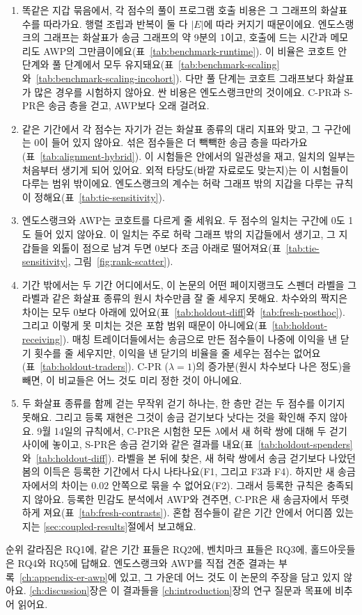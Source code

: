 \begin{enumerate}
\item[C1.] 똑같은 지갑 묶음에서, 각 점수의 풀이 프로그램 호출 비용은 그 그래프의 화살표 수를 따라가요. 행렬 조립과 반복이 둘 다 $|E|$에 따라 커지기 때문이에요. 엔도스랭크의 그래프는 화살표가 송금 그래프의 약 9분의 1이고, 호출에 드는 시간과 메모리도 AWP의 그만큼이에요(표~\ref{tab:benchmark-runtime}). 이 비율은 코호트 안 단계와 풀 단계에서 모두 유지돼요(표~\ref{tab:benchmark-scaling}와~\ref{tab:benchmark-scaling-incohort}). 다만 풀 단계는 코호트 그래프보다 화살표가 많은 경우를 시험하지 않아요. 싼 비용은 엔도스랭크만의 것이에요. C-PR과 S-PR은 송금 층을 걷고, AWP보다 오래 걸려요.
\item[C2.] 같은 기간에서 각 점수는 자기가 걷는 화살표 종류의 대리 지표와 맞고, 그 구간에는 0이 들어 있지 않아요. 섞은 점수들은 더 빽빽한 송금 층을 따라가요(표~\ref{tab:alignment-hybrid}). 이 시험들은 안에서의 일관성을 재고, 일치의 일부는 처음부터 생기게 되어 있어요. 외적 타당도(바깥 자료로도 맞는지)는 이 시험들이 다루는 범위 밖이에요. 엔도스랭크의 계수는 허락 그래프 밖의 지갑을 다루는 규칙이 정해요(표~\ref{tab:tie-sensitivity}).
\item[C3.] 엔도스랭크와 AWP는 코호트를 다르게 줄 세워요. 두 점수의 일치는 구간에 0도 1도 들어 있지 않아요. 이 일치는 주로 허락 그래프 밖의 지갑들에서 생기고, 그 지갑들을 외톨이 점으로 남겨 두면 0보다 조금 아래로 떨어져요(표~\ref{tab:tie-sensitivity}, 그림~\ref{fig:rank-scatter}).
\item[C4.] 기간 밖에서는 두 기간 어디에서도, 이 논문의 어떤 페이지랭크도 스펜더 라벨을 그 라벨과 같은 화살표 종류의 원시 차수만큼 잘 줄 세우지 못해요. 차수와의 짝지은 차이는 모두 0보다 아래에 있어요(표~\ref{tab:holdout-diff}와~\ref{tab:fresh-posthoc}). 그리고 이렇게 못 미치는 것은 포함 범위 때문이 아니에요(표~\ref{tab:holdout-receiving}). 매칭 트레이더들에서는 송금으로 만든 점수들이 나중에 이익을 낸 닫기 횟수를 줄 세우지만, 이익을 낸 닫기의 비율을 줄 세우는 점수는 없어요(표~\ref{tab:holdout-traders}). C-PR ($\lambda=1$)의 증가분(원시 차수보다 나은 정도)을 빼면, 이 비교들은 어느 것도 미리 정한 것이 아니에요.
\item[C5.] 두 화살표 종류를 함께 걷는 무작위 걷기 하나는, 한 층만 걷는 두 점수를 이기지 못해요. 그리고 등록 재현은 그것이 송금 걷기보다 낫다는 것을 확인해 주지 않아요. 9월 14일의 규칙에서, C-PR은 시험한 모든 $\lambda$에서 새 허락 쌍에 대해 두 걷기 사이에 놓이고, S-PR은 송금 걷기와 같은 결과를 내요(표~\ref{tab:holdout-spenders}와~\ref{tab:holdout-diff}). 라벨을 본 뒤에 찾은, 새 허락 쌍에서 송금 걷기보다 나았던 봄의 이득은 등록한 기간에서 다시 나타나요(F1, 그리고 F3과 F4). 하지만 새 송금자에서의 차이는 $0.02$ 안쪽으로 묶을 수 없어요(F2). 그래서 등록한 규칙은 충족되지 않아요. 등록한 민감도 분석에서 AWP와 견주면, C-PR은 새 송금자에서 뚜렷하게 져요(표~\ref{tab:fresh-contrasts}). 혼합 점수들이 같은 기간 안에서 어디쯤 있는지는 \ref{sec:coupled-results}절에서 보고해요.
\end{enumerate}

순위 갈라짐은 RQ1에, 같은 기간 표들은 RQ2에, 벤치마크 표들은 RQ3에, 홀드아웃들은 RQ4와 RQ5에 답해요. 엔도스랭크와 AWP를 직접 견준 결과는 부록~\ref{ch:appendix-er-awp}에 있고, 그 가운데 어느 것도 이 논문의 주장을 담고 있지 않아요. \ref{ch:discussion}장은 이 결과들을 \ref{ch:introduction}장의 연구 질문과 목표에 비추어 읽어요.
